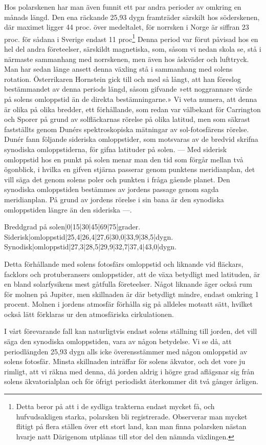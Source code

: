 \documentclass[a4paper, 12pt, oneside, swedish]{article}
\begin{document}
Hos polarskenen har man även funnit ett par andra perioder av omkring en månads längd. Den ena räckande 25,93 dygn framträder särskilt hos söderskenen, där maximet ligger 44 proc. över medeltalet, för norrsken i Norge är siffran 23 proc. för sådana i Sverige endast 11 proc\footnote{Detta beror på att i de sydliga trakterna endast mycket få, och hufvudsakligen starka, polarsken bli registrerade. Observerar man mycket flitigt på flera ställen över ett stort land, kan man finna polarsken nästan hvarje natt Därigenom utplånas till stor del den nämnda växlingen.} Denna period var förut påvisad hos en hel del andra företeelser, särskildt magnetiska, som, såsom vi nedan skola se, stå i närmaste sammanhang med norrskenen, men även hos åskväder och lufttryck. Man har sedan länge ansett denna växling stå i sammanhang med solens rotation. Österrikaren Hornstein gick till och med så långt, att han föreslog bestämmandet av denna periods längd, såsom gifvande »ett noggrannare värde på solens omloppstid än de direkta bestämningarne.» Vi veta numera, att denna är olika på olika bredder, ett förhållande, som redan var välbekant för Carrington och Sporer på grund av solfläckarnas rörelse på olika latitud, men som säkrast fastställts genom Dunérs spektroskopiska mätningar av sol-fotosfärens rörelse. Dunér fann följande sideriska omloppstider, som motsvaras av de bredvid skrifna synodiska omloppstiderna, för gifna latituder på solen. --- Med siderisk omloppstid hos en punkt på solen menar man den tid som förgår mellan två ögonblick, i hvilka en gifven stjärna passerar genom punktens meridianplan, det vill säga det genom solens poler och punkten i fråga gående planet. Den synodiska omloppstiden bestämmes av jordens passage genom sagda meridianplan. På grund av jordens rörelse i sin bana är den synodiska omloppstiden längre än den sideriska ---.

Breddgrad på solen|0|15|30|45|69|75|grader.  
Siderisk|omloppstid|25,4|26,4|27,6|30,0|33,9|38,5|dygn.  
Synodisk|omloppstid|27,3|28,5|29,9|32,7|37,4|43,0|dygn.  

Detta förhållande med solens fotosfärs omloppstid och liknande vid fläckars, facklors och protuberansers omloppstider, att de växa betydligt med latituden, är en bland solarfysikens mest gåtfulla företeelser. Något liknande äger också rum för molnen på Jupiter, men skillnaden är där betydligt mindre, endast omkring 1 procent. Molnen i jordens atmosfär förhålla sig på alldeles motsatt sätt, hvilket också lätt förklaras ur den atmosfäriska cirkulationen.

I vårt förevarande fall kan naturligtvis endast solens ställning till jorden, det vill säga den synodiska omloppstiden, vara av någon betydelse. Vi se då, att periodlängden 25,93 dygn alls icke överensstämmer med någon omloppstid av solens fotosfär. Minsta skillnaden inträffar för solens äkvator, och det vore ju rimligt, att vi räkna med denna, då jorden aldrig i högre grad aflägsnar sig från solens äkvatorialplan och för öfrigt periodiskt återkommer dit två gånger årligen.
\end{document}
